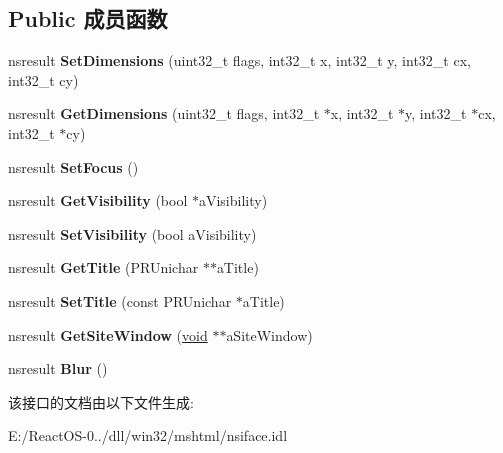 \subsection*{Public 成员函数}
\begin{DoxyCompactItemize}
\item 
\mbox{\label{interfacens_i_embedding_site_window_aa19144a28f90050fe017ab117b43d867}} 
nsresult {\bfseries Set\+Dimensions} (uint32\+\_\+t flags, int32\+\_\+t x, int32\+\_\+t y, int32\+\_\+t cx, int32\+\_\+t cy)
\item 
\mbox{\label{interfacens_i_embedding_site_window_a2ee905e843eed72c3fcfe7bc8737fd91}} 
nsresult {\bfseries Get\+Dimensions} (uint32\+\_\+t flags, int32\+\_\+t $\ast$x, int32\+\_\+t $\ast$y, int32\+\_\+t $\ast$cx, int32\+\_\+t $\ast$cy)
\item 
\mbox{\label{interfacens_i_embedding_site_window_aad5955302dcb80533af7c048dca886ef}} 
nsresult {\bfseries Set\+Focus} ()
\item 
\mbox{\label{interfacens_i_embedding_site_window_a42267e55a1e2a0271bf272e1224f3fba}} 
nsresult {\bfseries Get\+Visibility} (bool $\ast$a\+Visibility)
\item 
\mbox{\label{interfacens_i_embedding_site_window_ac7963e1441ae42f9be86748b40558b14}} 
nsresult {\bfseries Set\+Visibility} (bool a\+Visibility)
\item 
\mbox{\label{interfacens_i_embedding_site_window_a67be40cc08590fb12996116efb36db4d}} 
nsresult {\bfseries Get\+Title} (P\+R\+Unichar $\ast$$\ast$a\+Title)
\item 
\mbox{\label{interfacens_i_embedding_site_window_a7be60e01e05080d53575407b54c9a859}} 
nsresult {\bfseries Set\+Title} (const P\+R\+Unichar $\ast$a\+Title)
\item 
\mbox{\label{interfacens_i_embedding_site_window_af9514faa21b3c1d93002393f3f050e66}} 
nsresult {\bfseries Get\+Site\+Window} (\hyperlink{interfacevoid}{void} $\ast$$\ast$a\+Site\+Window)
\item 
\mbox{\label{interfacens_i_embedding_site_window_ac412cf62eea88ca5c4ff51e3857d871a}} 
nsresult {\bfseries Blur} ()
\end{DoxyCompactItemize}


该接口的文档由以下文件生成\+:\begin{DoxyCompactItemize}
\item 
E\+:/\+React\+O\+S-\/0../dll/win32/mshtml/nsiface.\+idl\end{DoxyCompactItemize}
